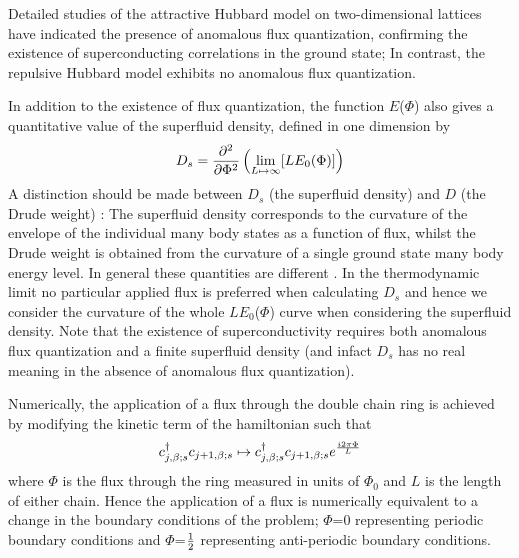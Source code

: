 {Detailed studies of the attractive
Hubbard model  on two-dimensional lattices \cite{afqhubb}
have indicated the presence of
anomalous flux quantization, confirming the existence of
 superconducting correlations in the ground state; In
contrast, the repulsive  Hubbard model exhibits no anomalous flux
quantization.

In addition to the existence of flux quantization, the function $E$($\Phi$)
also gives
a quantitative value of the superfluid density,
defined in one dimension by
\begin{eqnarray}
D_s={\partial^2\over \partial \Phi^2}\left
({\lim_{L\mapsto\infty}[LE_0(\Phi)]}\right )
\label{rhos}
\end{eqnarray}
A distinction should be made between $D_s$ (the superfluid density) and $D$
(the Drude weight) \cite{swz}:
The  superfluid density corresponds to the curvature of the
envelope of the individual many body states as a function of flux, whilst the
Drude
weight is obtained from the curvature of a single ground state many body
energy level. In general these quantities are different \cite{note1}.
 In the thermodynamic limit no particular
applied flux is preferred when calculating $D_s$ \cite{fye} and hence we
consider
the curvature of the whole $L$$E_0$($\Phi$) curve when considering the
superfluid density.
Note that the existence of superconductivity
requires both anomalous flux quantization and
a finite superfluid density (and infact $D_s$ has no real meaning in the
absence of anomalous flux quantization).


Numerically, the application of a flux through the double chain ring is
achieved by
modifying the kinetic term of the hamiltonian such that
\begin{eqnarray}
   {c}^{\dagger}_{j,\beta;s}{c}_{j+1,\beta;s} \mapsto
   {c}^{\dagger}_{j,\beta;s}{c}_{j+1,\beta;s} e^{i2\pi\Phi\over L}
\label{guage}
\end{eqnarray}
where $\Phi$ is the flux through the ring measured in units of $\Phi_0$ and $L$
is the
length of either chain. Hence the application of a flux is numerically
equivalent to
a change in the boundary conditions of the problem; $\Phi$=$0$ representing
periodic boundary conditions and $\Phi$=${1\over 2}$ representing anti-periodic
boundary conditions.

}
